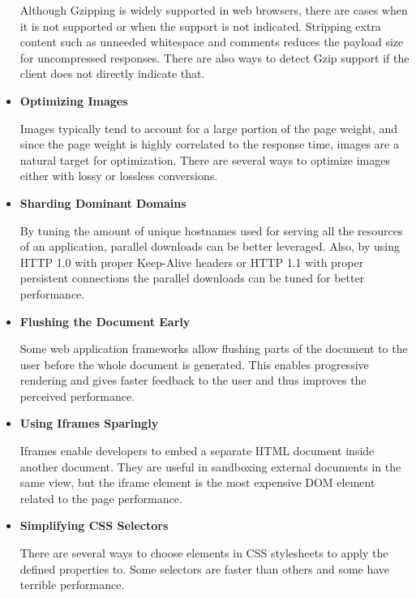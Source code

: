 \begin{itemize}
  Although Gzipping is widely supported in web browsers, there are
  cases when it is not supported or when the support is not
  indicated. Stripping extra content such as unneeded whitespace and
  comments reduces the payload size for uncompressed responses. There
  are also ways to detect Gzip support if the client does not directly
  indicate that.

\item \textbf{Optimizing Images}

  Images typically tend to account for a large portion of the page
  weight, and since the page weight is highly correlated to the
  response time, images are a natural target for optimization. There
  are several ways to optimize images either with lossy or lossless
  conversions.

\item \textbf{Sharding Dominant Domains}

  By tuning the amount of unique hostnames used for serving all the
  resources of an application, parallel downloads can be better
  leveraged. Also, by using HTTP 1.0 with proper Keep-Alive headers or
  HTTP 1.1 with proper persistent connections the parallel downloads
  can be tuned for better performance.

\item \textbf{Flushing the Document Early}

  Some web application frameworks allow flushing parts of the document
  to the user before the whole document is generated. This enables
  progressive rendering and gives faster feedback to the user and thus
  improves the perceived performance.

\item \textbf{Using Iframes Sparingly}

  Iframes enable developers to embed a separate HTML document inside
  another document. They are useful in sandboxing external documents
  in the same view, but the iframe element is the most expensive DOM
  element related to the page performance.

\item \textbf{Simplifying CSS Selectors}

  There are several ways to choose elements in CSS stylesheets to
  apply the defined properties to. Some selectors are faster than
  others and some have terrible performance.

\end{itemize}

